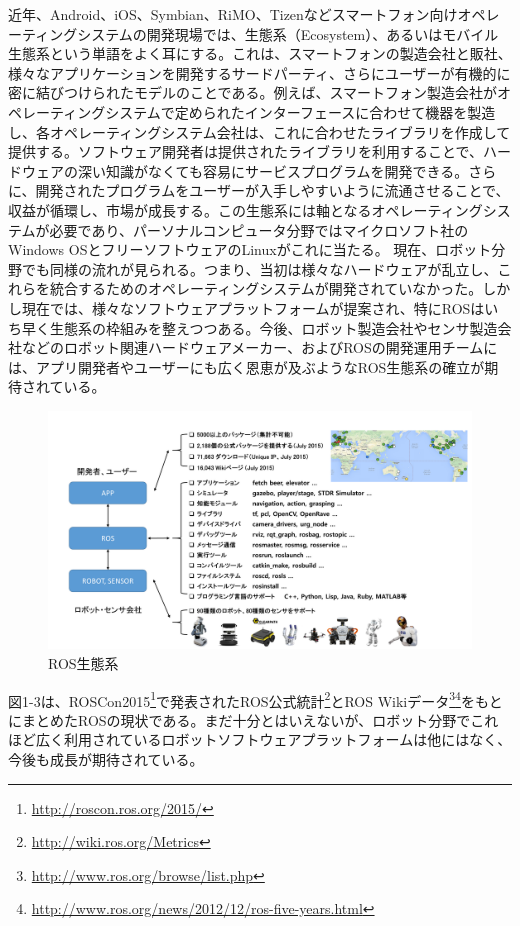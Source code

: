 近年、Android、iOS、Symbian、RiMO、Tizenなどスマートフォン向けオペレーティングシステムの開発現場では、生態系（Ecosystem）、あるいはモバイル生態系という単語をよく耳にする。これは、スマートフォンの製造会社と販社、様々なアプリケーションを開発するサードパーティ、さらにユーザーが有機的に密に結びつけられたモデルのことである。例えば、スマートフォン製造会社がオペレーティングシステムで定められたインターフェースに合わせて機器を製造し、各オペレーティングシステム会社は、これに合わせたライブラリを作成して提供する。ソフトウェア開発者は提供されたライブラリを利用することで、ハードウェアの深い知識がなくても容易にサービスプログラムを開発できる。さらに、開発されたプログラムをユーザーが入手しやすいように流通させることで、収益が循環し、市場が成長する。この生態系には軸となるオペレーティングシステムが必要であり、パーソナルコンピュータ分野ではマイクロソフト社のWindows OSとフリーソフトウェアのLinuxがこれに当たる。
現在、ロボット分野でも同様の流れが見られる。つまり、当初は様々なハードウェアが乱立し、これらを統合するためのオペレーティングシステムが開発されていなかった。しかし現在では、様々なソフトウェアプラットフォームが提案され、特にROSはいち早く生態系の枠組みを整えつつある。今後、ロボット製造会社やセンサ製造会社などのロボット関連ハードウェアメーカー、およびROSの開発運用チームには、アプリ開発者やユーザーにも広く恩恵が及ぶようなROS生態系の確立が期待されている。

\begin{figure}[h]
  \centering
  \includegraphics[width=\columnwidth]{pictures/chapter1/pic_01_03.png}
  \caption{ROS生態系}
\end{figure}

図1-3は、ROSCon2015\footnote{\url{http://roscon.ros.org/2015/}}で発表されたROS公式統計\footnote{\url{http://wiki.ros.org/Metrics}}とROS Wikiデータ\footnote{\url{http://www.ros.org/browse/list.php}}\footnote{\url{http://www.ros.org/news/2012/12/ros-five-years.html}}をもとにまとめたROSの現状である。まだ十分とはいえないが、ロボット分野でこれほど広く利用されているロボットソフトウェアプラットフォームは他にはなく、今後も成長が期待されている。

